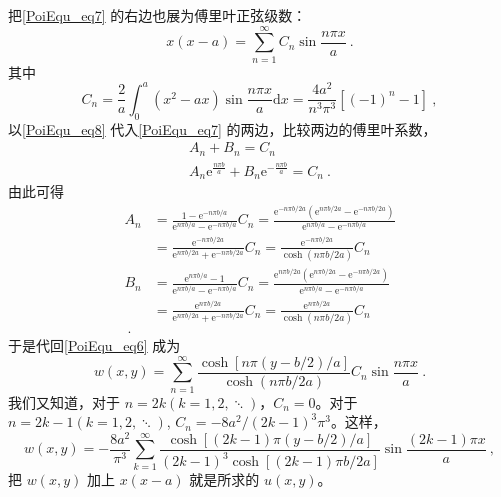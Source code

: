 \begin{example}{}
\begin{equation}
    \end{equation}
    把\autoref{PoiEqu_eq7} 的右边也展为傅里叶正弦级数：
    \begin{equation} \label{PoiEqu_eq8}
        x(x-a)=\sum_{n=1}^{\infty} C_{n} \sin \frac{n \pi x}{a}~.
    \end{equation}
    其中
    \begin{equation}
        C_{n}=\frac{2}{a} \int_{0}^{a}\left(x^{2}-a x\right) \sin \frac{n \pi x}{a} \mathrm{d} x=\frac{4 a^{2}}{n^{3} \pi^{3}}\left[(-1)^{n}-1\right]~,
    \end{equation}
    以\autoref{PoiEqu_eq8} 代入\autoref{PoiEqu_eq7} 的两边，比较两边的傅里叶系数，
    \begin{equation}
        \begin{array}{c}A_{n}+B_{n}=C_{n} \\ A_{n} \mathrm{e}^{\frac{n \pi b}{a}}+B_{n} \mathrm{e}^{-\frac{n \pi b}{a}}=C_{n}~.\end{array}
    \end{equation}
    由此可得
    \begin{equation}
        \begin{aligned}
            A_n&=\frac{1-\text{e}^{-n\pi b/a}}{\text{e}^{n\pi b/a}-\text{e}^{-n\pi b/a}}C_n=\frac{\text{e}^{-n\pi b/2a}\left( \text{e}^{n\pi b/2a}-\text{e}^{-n\pi b/2a} \right)}{\text{e}^{n\pi b/a}-\text{e}^{-n\pi b/a}}\\
            &=\frac{\text{e}^{-n\pi b/2a}}{\text{e}^{n\pi b/2a}+\text{e}^{-n\pi b/2a}}C_n=\frac{\text{e}^{-n\pi b/2a}}{\cosh \left( n\pi b/2a \right)}C_n\\
            B_n&=\frac{\text{e}^{n\pi b/a}-1}{\text{e}^{n\pi b/a}-\text{e}^{-n\pi b/a}}C_n=\frac{\text{e}^{n\pi b/2a}\left( \text{e}^{n\pi b/2a}-\text{e}^{-n\pi b/2a} \right)}{\text{e}^{n\pi b/a}-\text{e}^{-n\pi b/a}}\\
            &=\frac{\text{e}^{n\pi b/2a}}{\text{e}^{n\pi b/2a}+\text{e}^{-n\pi b/2a}}C_n=\frac{\text{e}^{n\pi b/2a}}{\cosh \left( n\pi b/2a \right)}C_n\\~.
        \end{aligned}
    \end{equation}
    于是代回\autoref{PoiEqu_eq6} 成为
    \begin{equation}
        w(x, y)=\sum_{n=1}^{\infty} \frac{\cosh [n \pi(y-b / 2) / a]}{\cosh (n \pi b / 2 a)} C_{n} \sin \frac{n \pi x}{a}~.
    \end{equation}
    我们又知道，对于 $n=2k(k=1,2,\ddots)$，$C_n=0$。对于 $n=2k-1(k=1,2,\ddots)$, $C_n=-8a^2/(2k-1)^3\pi^3$。这样，
    \begin{equation}
        w(x, y)=-\frac{8 a^{2}}{\pi^{3}} \sum_{k=1}^{\infty} \frac{\cosh [(2 k-1) \pi(y-b / 2) / a]}{(2 k-1)^{3} \cosh [(2 k-1) \pi b / 2 a]} \sin \frac{(2 k-1) \pi x}{a}~,
    \end{equation}
    把 $w(x,y)$ 加上 $x(x-a)$ 就是所求的 $u(x,y)$。
\end{example}
